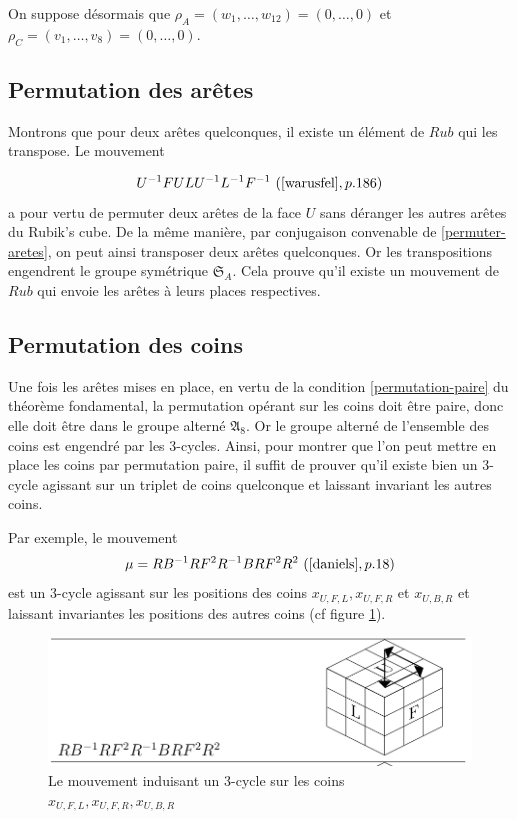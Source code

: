 \documentclass[french]{report}
\begin{document}
On suppose désormais que $\rho_A = (w_1, \dots, w _{12}) = (0, \dots, 0)$ et $\rho_C = (v_1, \dots, v_8) = (0, \dots, 0)$.

\subsection{Permutation des arêtes}

Montrons que pour deux arêtes quelconques, il existe un élément de $Rub$ qui les transpose. Le mouvement

\begin{equation}\label{permuter-aretes}
  U ^{-1} F U L U ^{-1} L ^{-1} F ^{-1} \ (\cite{warusfel}, p. 186)
\end{equation}  a pour vertu de permuter deux arêtes de la face $U$ sans déranger les autres arêtes du Rubik's cube. De la même manière, par conjugaison convenable de \ref{permuter-aretes}, on peut ainsi transposer deux arêtes quelconques. Or les transpositions engendrent le groupe symétrique $\mathfrak{S}_{A} $. Cela prouve qu'il existe un mouvement de $Rub$ qui envoie les arêtes à leurs places respectives.

\subsection{Permutation des coins}

Une fois les arêtes mises en place, en vertu de la condition \ref{permutation-paire} du théorème fondamental, la permutation opérant sur les coins doit être paire, donc elle doit être dans le groupe alterné $\mathfrak{A}_8$. Or le groupe alterné de l'ensemble des coins est engendré par les 3-cycles. Ainsi, pour montrer que l'on peut mettre en place les coins par permutation paire, il suffit de prouver qu'il existe bien un 3-cycle agissant sur un triplet de coins quelconque et laissant invariant les autres coins.

Par exemple, le mouvement \begin{equation}
  \mu = RB ^{-1}  RF ^2 R ^{-1}  BRF ^2 R ^2 \ (\cite{daniels}, p. 18)
\end{equation} est un 3-cycle agissant sur les positions des coins $x _{U,F,L}, x _{U,F,R}$ et $x _{U,B,R}$ et laissant invariantes les positions des autres coins (cf figure \ref{3_cycle_coin}).

\begin{figure}[h!]
  \centering
  \includegraphics[scale=0.3]{figures/3_cycle_coin.png}
  \caption{Le mouvement induisant un 3-cycle sur les coins $x _{U,F,L},x _{U,F,R}, x _{U,B,R} $}
  \label{3_cycle_coin}
\end{figure}
\end{document}
